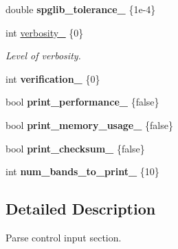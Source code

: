 \begin{DoxyCompactItemize}
\item 
\hypertarget{structsirius_1_1_control__input__section_ad8261ef7e593ad26ad026b82f1af0cd4}{}double {\bfseries spglib\+\_\+tolerance\+\_\+} \{1e-\/4\}\label{structsirius_1_1_control__input__section_ad8261ef7e593ad26ad026b82f1af0cd4}

\item 
int \hyperlink{structsirius_1_1_control__input__section_ac378c6c686b420b511878d41905d493a}{verbosity\+\_\+} \{0\}
\begin{DoxyCompactList}\small\item\em Level of verbosity. \end{DoxyCompactList}\item 
\hypertarget{structsirius_1_1_control__input__section_a57a3bbc0a8877ab602d4814118a1a7cb}{}int {\bfseries verification\+\_\+} \{0\}\label{structsirius_1_1_control__input__section_a57a3bbc0a8877ab602d4814118a1a7cb}

\item 
\hypertarget{structsirius_1_1_control__input__section_ae4bde4b53823da11656d644f3bf19d80}{}bool {\bfseries print\+\_\+performance\+\_\+} \{false\}\label{structsirius_1_1_control__input__section_ae4bde4b53823da11656d644f3bf19d80}

\item 
\hypertarget{structsirius_1_1_control__input__section_a0f6bdc3a5254db2563309fb793f6f981}{}bool {\bfseries print\+\_\+memory\+\_\+usage\+\_\+} \{false\}\label{structsirius_1_1_control__input__section_a0f6bdc3a5254db2563309fb793f6f981}

\item 
\hypertarget{structsirius_1_1_control__input__section_a69cc437afb16ac82bb6d97f5111d5398}{}bool {\bfseries print\+\_\+checksum\+\_\+} \{false\}\label{structsirius_1_1_control__input__section_a69cc437afb16ac82bb6d97f5111d5398}

\item 
\hypertarget{structsirius_1_1_control__input__section_a5a4274c8f59f8aaddf2ab0aef492b4aa}{}int {\bfseries num\+\_\+bands\+\_\+to\+\_\+print\+\_\+} \{10\}\label{structsirius_1_1_control__input__section_a5a4274c8f59f8aaddf2ab0aef492b4aa}

\end{DoxyCompactItemize}


\subsection{Detailed Description}
Parse control input section. 


